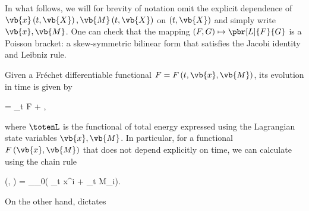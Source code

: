 \documentclass[../main.tex]{subfiles}
\begin{document}
In what follows, we will for brevity of notation omit the explicit dependence of $\vb{x}\left(t, \vb{X}\right), \vb{M}\left(t, \vb{X}\right)$ on $\left(t, \vb{X}\right)$ and simply write $\vb{x}, \vb{M}$. One can check that the mapping $\left(F, G\right) \mapsto \pbr[L]{F}{G}$ is a Poisson bracket: a skew-symmetric bilinear form that satisfies the Jacobi identity and Leibniz rule.

Given a Fréchet differentiable functional $F = F\left(t, \vb{x}, \vb{M}\right)$, its evolution in time is given by \autocite[p.~2]{pavelkaHamiltonianContinuumMechanics2020} 

\begin{equations}[single,!,numberline=all]
\label{eq:TIME-EVOL}
 = \partial_t F + ,
\end{equations}

where $\totenL$ is the functional of total energy expressed using the Lagrangian state variables $\vb{x}, \vb{M}$. In particular, for a functional $F\left(\vb{x}, \vb{M}\right)$ that does not depend explicitly on time, we can calculate using the chain rule

\begin{equations}[single,*]
	\left(, \right) = \bigint_{\Omega_0}\left( \partial_t x^i + \partial_t M_i\right).
\end{equations}

On the other hand,  dictates
\end{document}
